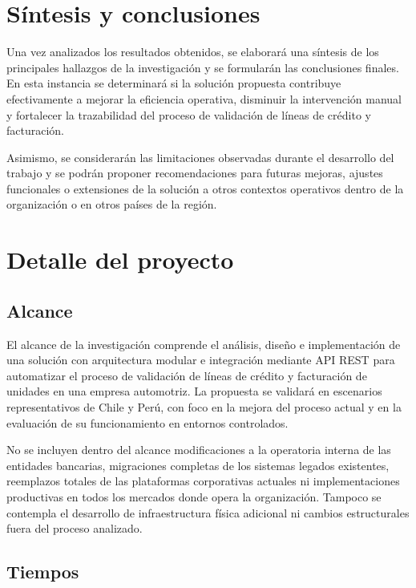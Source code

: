 \section{Síntesis y conclusiones}

Una vez analizados los resultados obtenidos, se elaborará una síntesis de los principales hallazgos de la investigación y se formularán las conclusiones finales. En esta instancia se determinará si la solución propuesta contribuye efectivamente a mejorar la eficiencia operativa, disminuir la intervención manual y fortalecer la trazabilidad del proceso de validación de líneas de crédito y facturación.

Asimismo, se considerarán las limitaciones observadas durante el desarrollo del trabajo y se podrán proponer recomendaciones para futuras mejoras, ajustes funcionales o extensiones de la solución a otros contextos operativos dentro de la organización o en otros países de la región.

\section{Detalle del proyecto}

\subsection{Alcance}

El alcance de la investigación comprende el análisis, diseño e implementación de una solución con arquitectura modular e integración mediante API REST para automatizar el proceso de validación de líneas de crédito y facturación de unidades en una empresa automotriz. La propuesta se validará en escenarios representativos de Chile y Perú, con foco en la mejora del proceso actual y en la evaluación de su funcionamiento en entornos controlados.

No se incluyen dentro del alcance modificaciones a la operatoria interna de las entidades bancarias, migraciones completas de los sistemas legados existentes, reemplazos totales de las plataformas corporativas actuales ni implementaciones productivas en todos los mercados donde opera la organización. Tampoco se contempla el desarrollo de infraestructura física adicional ni cambios estructurales fuera del proceso analizado.

\subsection{Tiempos}

